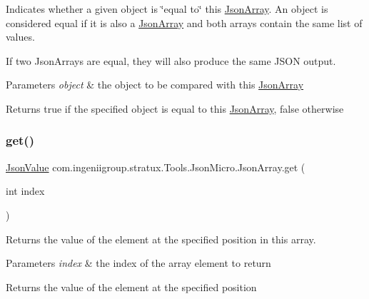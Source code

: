 Indicates whether a given object is \char`\"{}equal to\char`\"{} this \hyperlink{classcom_1_1ingeniigroup_1_1stratux_1_1_tools_1_1_json_micro_1_1_json_array}{Json\+Array}. An object is considered equal if it is also a {\ttfamily \hyperlink{classcom_1_1ingeniigroup_1_1stratux_1_1_tools_1_1_json_micro_1_1_json_array}{Json\+Array}} and both arrays contain the same list of values. 

If two Json\+Arrays are equal, they will also produce the same J\+S\+ON output. 


\begin{DoxyParams}{Parameters}
{\em object} & the object to be compared with this \hyperlink{classcom_1_1ingeniigroup_1_1stratux_1_1_tools_1_1_json_micro_1_1_json_array}{Json\+Array} \\
\hline
\end{DoxyParams}
\begin{DoxyReturn}{Returns}
{\ttfamily true} if the specified object is equal to this \hyperlink{classcom_1_1ingeniigroup_1_1stratux_1_1_tools_1_1_json_micro_1_1_json_array}{Json\+Array}, {\ttfamily false} otherwise 
\end{DoxyReturn}
\mbox{\label{classcom_1_1ingeniigroup_1_1stratux_1_1_tools_1_1_json_micro_1_1_json_array_a3cef2428f522259f9fbd827fd60a17ea}} 
\subsubsection{\texorpdfstring{get()}{get()}}
{\footnotesize\ttfamily \hyperlink{classcom_1_1ingeniigroup_1_1stratux_1_1_tools_1_1_json_micro_1_1_json_value}{Json\+Value} com.\+ingeniigroup.\+stratux.\+Tools.\+Json\+Micro.\+Json\+Array.\+get (\begin{DoxyParamCaption}\item[{int}]{index }\end{DoxyParamCaption})}

Returns the value of the element at the specified position in this array.


\begin{DoxyParams}{Parameters}
{\em index} & the index of the array element to return \\
\hline
\end{DoxyParams}
\begin{DoxyReturn}{Returns}
the value of the element at the specified position 
\end{DoxyReturn}

